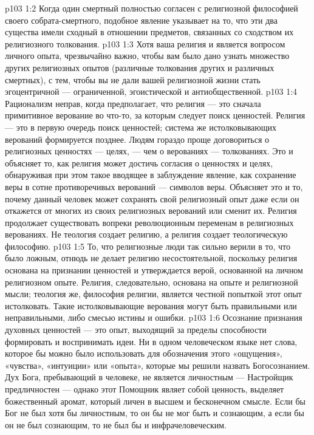 \vs p103 1:2 Когда один смертный полностью согласен с религиозной философией своего собрата\hyp{}смертного, подобное явление указывает на то, что эти два существа имели сходный  в отношении предметов, связанных со сходством их религиозного толкования.
\vs p103 1:3 Хотя ваша религия и является вопросом личного опыта, чрезвычайно важно, чтобы вам было дано узнать множество других религиозных опытов (различные толкования других и различных смертных), с тем, чтобы вы не дали вашей религиозной жизни стать эгоцентричной --- ограниченной, эгоистической и антиобщественной.
\vs p103 1:4 Рационализм неправ, когда предполагает, что религия --- это сначала примитивное верование во что\hyp{}то, за которым следует поиск ценностей. Религия --- это в первую очередь поиск ценностей; система же истолковывающих верований формируется позднее. Людям гораздо проще договориться о религиозных ценностях --- целях, --- чем о верованиях --- толкованиях. Это и объясняет то, как религия может достичь согласия о ценностях и целях, обнаруживая при этом такое вводящее в заблуждение явление, как сохранение веры в сотне противоречивых верований --- символов веры. Объясняет это и то, почему данный человек может сохранять свой религиозный опыт даже если он откажется от многих из своих религиозных верований или сменит их. Религия продолжает существовать вопреки революционным переменам в религиозных верованиях. Не теология создает религию, а религия создает теологическую философию.
\vs p103 1:5 То, что религиозные люди так сильно верили в то, что было ложным, отнюдь не делает религию несостоятельной, поскольку религия основана на признании ценностей и утверждается верой, основанной на личном религиозном опыте. Религия, следовательно, основана на опыте и религиозной мысли; теология же, философия религии, является честной попыткой этот опыт истолковать. Такие истолковывающие верования могут быть правильными или неправильными, либо смесью истины и ошибки.
\vs p103 1:6 Осознание признания духовных ценностей --- это опыт, выходящий за пределы способности формировать и воспринимать идеи. Ни в одном человеческом языке нет слова, которое бы можно было использовать для обозначения этого «ощущения», «чувства», «интуиции» или «опыта», которые мы решили назвать Богосознанием. Дух Бога, пребывающий в человеке, не является личностным --- Настройщик предличностен --- однако этот Помощник являет собой ценность, выделяет божественный аромат, который личен в высшем и бесконечном смысле. Если бы Бог не был хотя бы личностным, то он бы не мог быть и сознающим, а если бы он не был сознающим, то не был бы и инфрачеловеческим.

